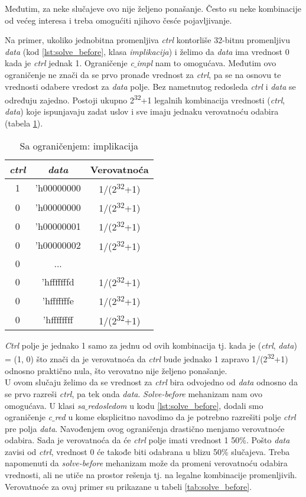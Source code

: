Međutim, za neke slučajeve ovo nije željeno ponašanje.
Često su neke kombinacije od većeg interesa i treba omogućiti njihovo česće
pojavljivanje.

Na primer, ukoliko jednobitna promenljiva \emph{ctrl} kontorliše
32-bitnu promenljivu \emph{data} (kod \ref{lst:solve_before}, klasa
\emph{implikacija}) i želimo da \emph{data} ima vrednost 0 kada je \emph{ctrl}
jednak 1.
Ograničenje \emph{c\(\_\)impl} nam to omogućava.
Međutim ovo ograničenje ne znači da se prvo pronađe vrednost za \emph{ctrl}, pa
se na osnovu te vrednosti odabere vredost za \emph{data} polje.
Bez nametnutog redosleda \emph{ctrl} i \emph{data} se određuju zajedno.
Postoji ukupno 2\textsuperscript{32}+1 legalnih kombinacija vrednosti
(\emph{ctrl}, \emph{data}) koje ispunjavaju zadat uslov i sve imaju jednaku
verovatnoću odabira (tabela \ref{tab:impl}).

\begin{table}[!htb]
  \centering
  \begin{tabular}{|c|c|c|}\hline
    \textbf{\emph{ctrl}}&\textbf{\emph{data}}&\textbf{Verovatnoća} \\ \hline
    1&'h00000000&1/(2\textsuperscript{32}+1) \\ \hline
    0&'h00000000&1/(2\textsuperscript{32}+1) \\ \hline
    0&'h00000001&1/(2\textsuperscript{32}+1) \\ \hline
    0&'h00000002&1/(2\textsuperscript{32}+1) \\ \hline
    0&...& \\ \hline
    0&'hfffffffd&1/(2\textsuperscript{32}+1) \\ \hline
    0&'hfffffffe&1/(2\textsuperscript{32}+1) \\ \hline
    0&'hffffffff&1/(2\textsuperscript{32}+1) \\ \hline
  \end{tabular}
  \caption{Sa ograničenjem: implikacija}\label{tab:impl}
\end{table}

\emph{Ctrl} polje je jednako 1 samo za jednu od ovih kombinacija tj. kada je
(\emph{ctrl}, \emph{data}) = (1, 0) što znači da je verovatnoća da \emph{ctrl}
bude jednako 1 zapravo 1/(2\textsuperscript{32}+1) odnosno praktično nula, što
verovatno nije željeno ponašanje.\\

U ovom slučaju želimo da se vrednost za \emph{ctrl} bira odvojedno od
\emph{data} odnosno da se prvo razreši \emph{ctrl}, pa tek onda \emph{data}.
\emph{Solve-before} mehanizam nam ovo omogućava.
U klasi \emph{sa\(\_\)redosledom} u kodu \ref{lst:solve_before}, dodali smo
ograničenje \emph{c\(\_\)red} u kome eksplicitno navodimo da je potrebno
razrešiti polje \emph{ctrl} pre polja \emph{data}.
Navođenjem ovog ograničenja drastično menjamo verovatnoće odabira.
Sada je verovatnoća da će \emph{ctrl} polje imati vrednost 1 50\%.
Pošto \emph{data} zavisi od \emph{ctrl}, vrednost 0 će takođe biti odabrana u
blizu 50\% slučajeva.
Treba napomenuti da \emph{solve-before} mehanizam može da promeni verovatnoću
odabira vrednosti, ali ne utiče na prostor rešenja tj. na legalne kombinacije
promenljivih.
Verovatnoće za ovaj primer su prikazane u tabeli \ref{tab:solve_before}.

